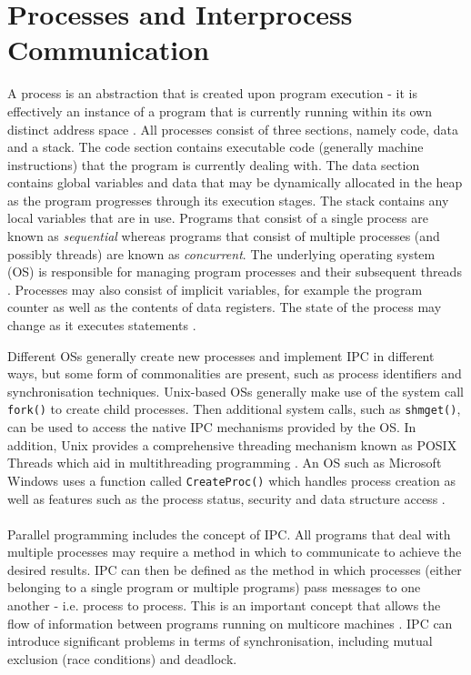 \documentclass[12pt,a4paper,oneside]{article}
\def\code#1{\texttt{#1}}
\begin{document}
\section{Processes and Interprocess Communication}
\begin{spacing}{1.4}
A process is an abstraction that is created upon program execution - it is effectively an instance of a program that is currently running within its own distinct address space \citep{modernOS}. All processes consist of three sections, namely code, data and a stack. The code section contains executable code (generally machine instructions) that the program is currently dealing with. The data section contains global variables and data that may be dynamically allocated in the heap as the program progresses through its execution stages. The stack contains any local variables that are in use. Programs that consist of a single process are known as \textit{sequential} whereas programs that consist of multiple processes (and possibly threads) are known as \textit{concurrent}. The underlying operating system (OS) is responsible for managing program processes and their subsequent threads \citep{garg2005concurrent}. Processes may also consist of implicit variables, for example the program counter as well as the contents of data registers. The state of the process may change as it executes statements \citep{trainBook}.

Different OSs generally create new processes and implement IPC in different ways, but some form of commonalities are present, such as process identifiers and synchronisation techniques. Unix-based OSs generally make use of the system call \code{fork()} to create child processes. Then additional system calls, such as \code{shmget()}, can be used to access the native IPC mechanisms provided by the OS. In addition, Unix provides a comprehensive threading mechanism known as POSIX Threads which aid in multithreading programming \citep{linuxKernal}. An OS such as Microsoft Windows uses a function called \code{CreateProc()} which handles process creation as well as features such as the process status, security and data structure access \citep{modernOS}. 
\\\\
Parallel programming includes the concept of IPC. All programs that deal with multiple processes may require a method in which to communicate to achieve the desired results. IPC can then be defined as the method in which processes (either belonging to a single program or multiple programs) pass messages to one another - i.e. process to process. This is an important concept that allows the flow of information between programs running on multicore machines \citep{modernOS}. IPC can introduce significant problems in terms of synchronisation, including mutual exclusion (race conditions) and deadlock.


\end{spacing}
\end{document}
